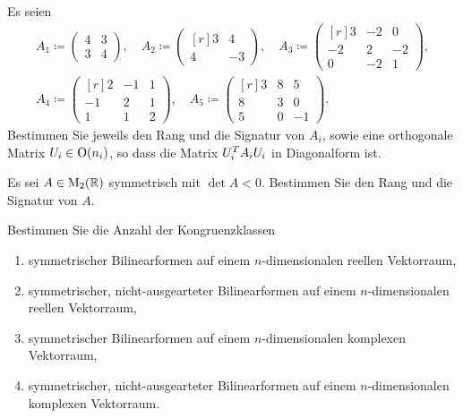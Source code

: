 \documentclass[a4paper, 10pt]{scrartcl}
\begin{document}
\begin{question}
  Es seien
  \begin{gather*}
              A_1
    \coloneqq \begin{pmatrix}
                4 & 3 \\
                3 & 4
              \end{pmatrix},
    \quad    
              A_2
    \coloneqq \begin{pmatrix*}[r]
                3 &   4 \\
                4 &  -3
              \end{pmatrix*},
    \quad     A_3
    \coloneqq \begin{pmatrix*}[r]
                 3  & -2  &  0  \\
                -2  &  2  & -2  \\
                 0  & -2  &  1
              \end{pmatrix*},
    \\
              A_4
    \coloneqq \begin{pmatrix*}[r]
                 2  & -1  & 1 \\
                -1  &  2  & 1 \\
                 1  &  1  & 2
              \end{pmatrix*},
    \quad
              A_5
    \coloneqq \begin{pmatrix*}[r]
                3 & 8 &  5  \\
                8 & 3 &  0  \\
                5 & 0 & -1
              \end{pmatrix*}.
  \end{gather*}
  Bestimmen Sie jeweils den Rang und die Signatur von $A_i$, sowie eine orthogonale Matrix $U_i \in \operatorname{O}(n_i)$, so dass die Matrix $U_i^T A_i U_i$ in Diagonalform ist.
\end{question}


\begin{question}
  Es sei $A \in \operatorname{M}_{2}(\mathbb{R})$ symmetrisch mit $\det A < 0$.
  Bestimmen Sie den Rang und die Signatur von $A$.
\end{question}


\begin{question}
  Bestimmen Sie die Anzahl der Kongruenzklassen
  \begin{enumerate}
    \item
      symmetrischer Bilinearformen auf einem $n$-dimensionalen reellen Vektorraum,
    \item
      symmetrischer, nicht-ausgearteter Bilinearformen auf einem $n$-dimensionalen reellen Vektorraum,
    \item
      symmetrischer Bilinearformen auf einem $n$-dimensionalen komplexen Vektorraum,
    \item
      symmetrischer, nicht-ausgearteter Bilinearformen auf einem $n$-dimensionalen komplexen Vektorraum.
  \end{enumerate}
\end{question}
\end{document}
